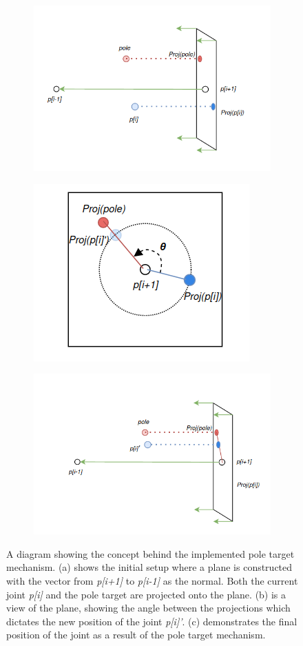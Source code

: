 \begin{figure}[!h]
    \centering
    \captionsetup{justification=centering}
    \begin{subfigure}{\textwidth}
        \centering
        \includegraphics[width=0.6\linewidth]{grafika/pole_start.png}
        \label{fig:pole_start}
    \end{subfigure}
    \begin{subfigure}{\textwidth}
        \centering
        \includegraphics[width=0.4\linewidth]{grafika/pole_projection.png}
        \label{fig:pole_projection}
    \end{subfigure}
    \begin{subfigure}{\textwidth}
        \centering
        \includegraphics[width=0.6\linewidth]{grafika/pole_end.png}
        \label{fig:pole_end}
    \end{subfigure}
    \caption{A diagram showing the concept behind the implemented pole target
    mechanism. (a) shows the initial setup where a plane is constructed with the
    vector from \textit{p[i+1]} to \textit{p[i-1]} as the normal. Both the
    current joint \textit{p[i]} and the pole target are projected onto the
    plane. (b) is a view of the plane, showing the angle between the
    projections which dictates the new position of the joint \textit{p[i]'}. (c)
    demonstrates the final position of the joint as a result of the pole target
    mechanism.}
    \label{fig:pole_diagram}
\end{figure}

